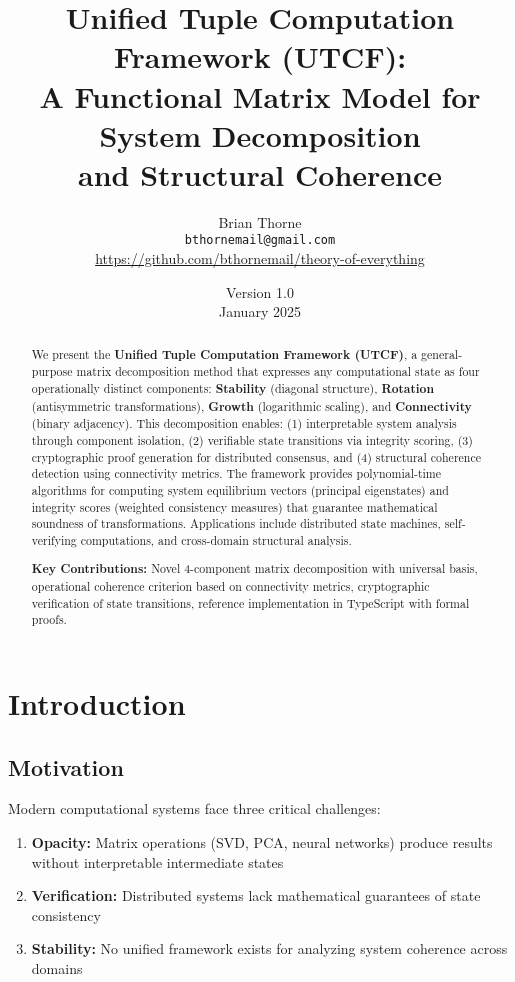 \documentclass[11pt,a4paper]{article}
\title{\textbf{Unified Tuple Computation Framework (UTCF):} \\
\large A Functional Matrix Model for System Decomposition \\ and Structural Coherence}
\author{
  Brian Thorne \\
  \texttt{bthornemail@gmail.com} \\
  \url{https://github.com/bthornemail/theory-of-everything}
}
\date{Version 1.0 \\ January 2025}
\theoremstyle{definition}
\theoremstyle{remark}
\begin{document}
\maketitle

\begin{abstract}
We present the \textbf{Unified Tuple Computation Framework (UTCF)}, a general-purpose matrix decomposition method that expresses any computational state as four operationally distinct components: \textbf{Stability} (diagonal structure), \textbf{Rotation} (antisymmetric transformations), \textbf{Growth} (logarithmic scaling), and \textbf{Connectivity} (binary adjacency). This decomposition enables: (1) interpretable system analysis through component isolation, (2) verifiable state transitions via integrity scoring, (3) cryptographic proof generation for distributed consensus, and (4) structural coherence detection using connectivity metrics. The framework provides polynomial-time algorithms for computing system equilibrium vectors (principal eigenstates) and integrity scores (weighted consistency measures) that guarantee mathematical soundness of transformations. Applications include distributed state machines, self-verifying computations, and cross-domain structural analysis.

\textbf{Key Contributions:} Novel 4-component matrix decomposition with universal basis, operational coherence criterion based on connectivity metrics, cryptographic verification of state transitions, reference implementation in TypeScript with formal proofs.
\end{abstract}

\tableofcontents
\newpage

\section{Introduction}

\subsection{Motivation}

Modern computational systems face three critical challenges:

\begin{enumerate}
\item \textbf{Opacity:} Matrix operations (SVD, PCA, neural networks) produce results without interpretable intermediate states
\item \textbf{Verification:} Distributed systems lack mathematical guarantees of state consistency
\item \textbf{Stability:} No unified framework exists for analyzing system coherence across domains
\end{enumerate}
\end{document}

